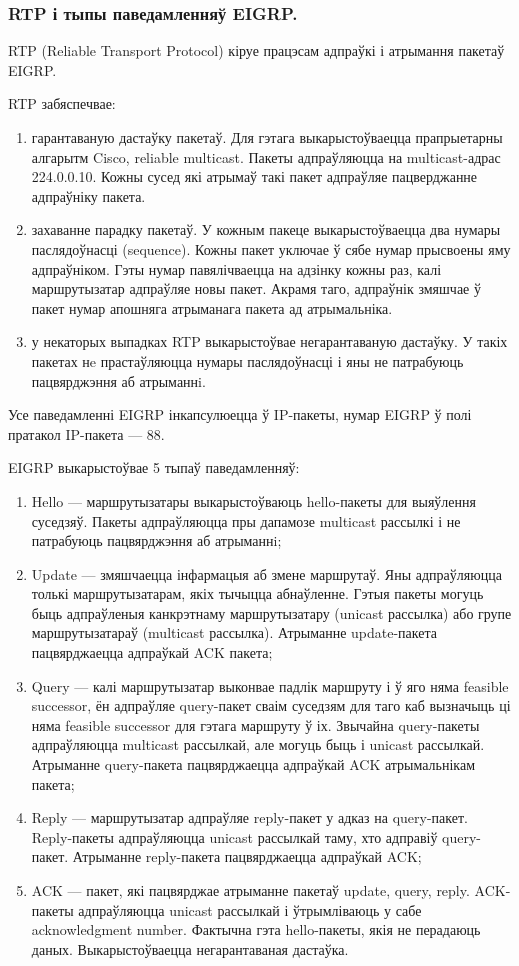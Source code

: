 \subsubsection{RTP і тыпы паведамленняў EIGRP.}

RTP (Reliable Transport Protocol) кіруе працэсам адпраўкі і атрымання пакетаў EIGRP.

RTP забяспечвае:
\begin{enumerate}
    \item гарантаваную дастаўку пакетаў. Для гэтага выкарыстоўваецца прапрыетарны алгарытм Cisco, reliable multicast. Пакеты адпраўляюцца на multicast-адрас 224.0.0.10. Кожны сусед які атрымаў такі пакет адпраўляе пацверджанне адпраўніку пакета.
    \item захаванне парадку пакетаў. У кожным пакеце выкарыстоўваецца два нумары паслядоўнасці (sequence). Кожны пакет уключае ў сябе нумар прысвоены яму адпраўніком. Гэты нумар павялічваецца на адзінку кожны раз, калі маршрутызатар адпраўляе новы пакет. Акрамя таго, адпраўнік змяшчае ў пакет нумар апошняга атрыманага пакета ад атрымальніка.
    \item у некаторых выпадках RTP выкарыстоўвае негарантаваную дастаўку. У такіх пакетах нe прастаўляюцца нумары паслядоўнасці і яны не патрабуюць пацвярджэння аб атрыманнi.
\end{enumerate}

Усе паведамленні EIGRP інкапсулюецца ў IP-пакеты, нумар EIGRP ў полі пратакол IP-пакета --- 88.

EIGRP выкарыстоўвае 5 тыпаў паведамленняў:
\begin{enumerate}
    \item Hello --- маршрутызатары выкарыстоўваюць hello-пакеты для выяўлення суседзяў. Пакеты адпраўляюцца пры дапамозе multicast рассылкі і не патрабуюць пацвярджэння аб атрыманнi;
    \item Update --- змяшчаецца інфармацыя аб змене маршрутаў. Яны адпраўляюцца толькі маршрутызатарам, якіх тычыцца абнаўленне. Гэтыя пакеты могуць быць адпраўленыя канкрэтнаму маршрутызатару (unicast рассылка) або групе маршрутызатараў (multicast рассылка). Атрыманне update-пакета пацвярджаецца адпраўкай ACK пакета;
    \item Query --- калі маршрутызатар выконвае падлік маршруту і ў яго няма feasible successor, ён адпраўляе query-пакет сваім суседзям для таго каб вызначыць ці няма feasible successor для гэтага маршруту ў іх. Звычайна query-пакеты адпраўляюцца multicast рассылкай, але могуць быць і unicast рассылкай. Атрыманне query-пакета пацвярджаецца адпраўкай ACK атрымальнікам пакета;
    \item Reply --- маршрутызатар адпраўляе reply-пакет у адказ на query-пакет. Reply-пакеты адпраўляюцца unicast рассылкай таму, хто адправіў query-пакет. Атрыманне reply-пакета пацвярджаецца адпраўкай ACK;
    \item ACK --- пакет, які пацвярджае атрыманне пакетаў update, query, reply. ACK-пакеты адпраўляюцца unicast рассылкай і ўтрымліваюць у сабе acknowledgment number. Фактычна гэта hello-пакеты, якія не перадаюць даных. Выкарыстоўваецца негарантаваная дастаўка.
\end{enumerate}

